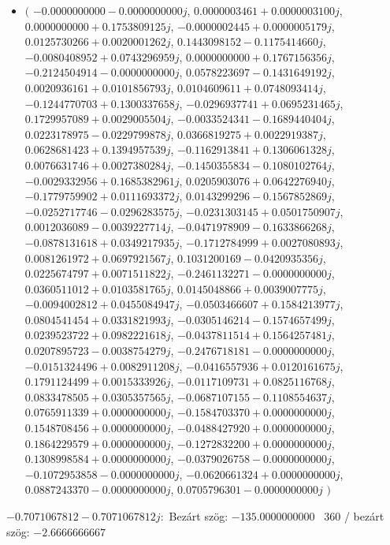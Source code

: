 \documentclass[14pt,a4paper]{article}
\begin{document}
\begin{itemize}
\item
$\big($
$-0.0000000000-0.0000000000j$, $0.0000003461+0.0000003100j$, $0.0000000000+0.1753809125j$, $-0.0000002445+0.0000005179j$, $0.0125730266+0.0020001262j$, $0.1443098152-0.1175414660j$, $-0.0080408952+0.0743296959j$, $0.0000000000+0.1767156356j$, $-0.2124504914-0.0000000000j$, $0.0578223697-0.1431649192j$, $0.0020936161+0.0101856793j$, $0.0104609611+0.0748093414j$, $-0.1244770703+0.1300337658j$, $-0.0296937741+0.0695231465j$, $0.1729957089+0.0029005504j$, $-0.0033524341-0.1689440404j$, $0.0223178975-0.0229799878j$, $0.0366819275+0.0022919387j$, $0.0628681423+0.1394957539j$, $-0.1162913841+0.1306061328j$, $0.0076631746+0.0027380284j$, $-0.1450355834-0.1080102764j$, $-0.0029332956+0.1685382961j$, $0.0205903076+0.0642276940j$, $-0.1779759902+0.0111693372j$, $0.0143299296-0.1567852869j$, $-0.0252717746-0.0296283575j$, $-0.0231303145+0.0501750907j$, $0.0012036089-0.0039227714j$, $-0.0471978909-0.1633866268j$, $-0.0878131618+0.0349217935j$, $-0.1712784999+0.0027080893j$, $0.0081261972+0.0697921567j$, $0.1031200169-0.0420935356j$, $0.0225674797+0.0071511822j$, $-0.2461132271-0.0000000000j$, $0.0360511012+0.0103581765j$, $0.0145048866+0.0039007775j$, $-0.0094002812+0.0455084947j$, $-0.0503466607+0.1584213977j$, $0.0804541454+0.0331821993j$, $-0.0305146214-0.1574657499j$, $0.0239523722+0.0982221618j$, $-0.0437811514+0.1564257481j$, $0.0207895723-0.0038754279j$, $-0.2476718181-0.0000000000j$, $-0.0151324496+0.0082911208j$, $-0.0416557936+0.0120161675j$, $0.1791124499+0.0015333926j$, $-0.0117109731+0.0825116768j$, $0.0833478505+0.0305357565j$, $-0.0687107155-0.1108554637j$, $0.0765911339+0.0000000000j$, $-0.1584703370+0.0000000000j$, $0.1548708456+0.0000000000j$, $-0.0488427920+0.0000000000j$, $0.1864229579+0.0000000000j$, $-0.1272832200+0.0000000000j$, $0.1308998584+0.0000000000j$, $-0.0379026758-0.0000000000j$, $-0.1072953858-0.0000000000j$, $-0.0620661324+0.0000000000j$, $0.0887243370-0.0000000000j$, $0.0705796301-0.0000000000j$
$\big)$
\end{itemize}
$-0.7071067812-0.7071067812j$:\
Bezárt szög: $-135.0000000000$ \
360 / bezárt szög: $-2.6666666667$\
\end{document}
